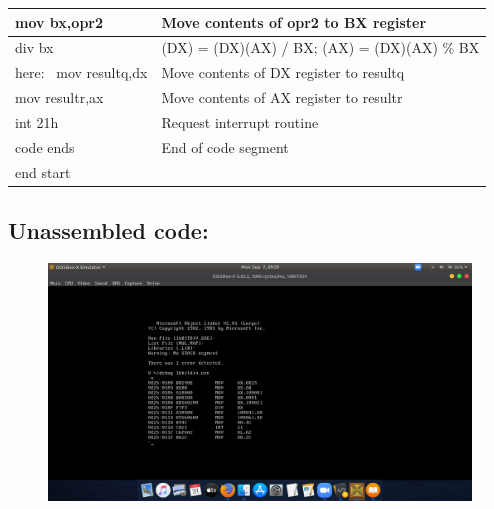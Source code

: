 \documentclass[12pt,a4paper]{article}
\begin{document}
\begin{flushleft}
\begin{table}[htb]
{\begin{tabular}{|l|l|}
\hline
mov bx,opr2                                                      & Move contents of opr2 to BX register          \\ 
\hline
div bx                                                           & (DX) = (DX)(AX) / BX; (AX) = (DX)(AX) \% BX   \\ 
\hline
here:~ mov resultq,dx                                            & Move contents of DX register to resultq       \\ 
\hline
mov resultr,ax                                                   & Move contents of AX register to resultr       \\ 
\hline
int 21h                                                          & Request interrupt routine                     \\ 
\hline
code ends                                                        & End of code segment                           \\
\hline
end start                                                        &                                               \\
\hline
\end{tabular}
}
\end{table}

\newpage
\subsection*{\textbf{Unassembled code:}}
\begin{figure}[h]
    \centering
    \includegraphics[trim = 100mm 60mm 150mm 127mm, clip, width = \textwidth]{DivisionUS.png}
\end{figure}

\end{flushleft}
\end{document}

